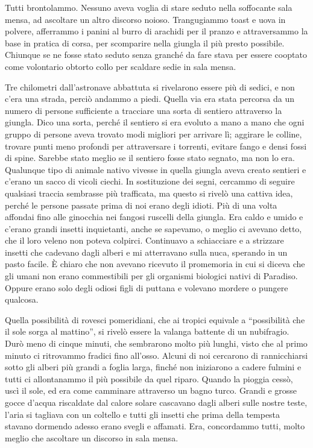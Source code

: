 Tutti brontolammo. Nessuno aveva voglia di stare seduto nella soffocante
sala mensa, ad ascoltare un altro discorso noioso. Trangugiammo toast e
uova in polvere, afferrammo i panini al burro di arachidi per il pranzo
e attraversammo la base in pratica di corsa, per scomparire nella
giungla il più presto possibile. Chiunque se ne fosse stato seduto senza
granché da fare stava per essere cooptato come volontario obtorto collo
per scaldare sedie in sala mensa.

Tre chilometri dall'astronave abbattuta si rivelarono essere più di
sedici, e non c'era una strada, perciò andammo a piedi. Quella via era
stata percorsa da un numero di persone sufficiente a tracciare una sorta
di sentiero attraverso la giungla. Dico una sorta, perché il sentiero si
era evoluto a mano a mano che ogni gruppo di persone aveva trovato modi
migliori per arrivare lì; aggirare le colline, trovare punti meno
profondi per attraversare i torrenti, evitare fango e densi fossi di
spine. Sarebbe stato meglio se il sentiero fosse stato segnato, ma non
lo era. Qualunque tipo di animale nativo vivesse in quella giungla aveva
creato sentieri e c'erano un sacco di vicoli ciechi. In sostituzione dei
segni, cercammo di seguire qualsiasi traccia sembrasse più trafficata,
ma questo si rivelò una cattiva idea, perché le persone passate prima di
noi erano degli idioti. Più di una volta affondai fino alle ginocchia
nei fangosi ruscelli della giungla. Era caldo e umido e c'erano grandi
insetti inquietanti, anche se sapevamo, o meglio ci avevano detto, che
il loro veleno non poteva colpirci. Continuavo a schiacciare e a
strizzare insetti che cadevano dagli alberi e mi atterravano sulla nuca,
sperando in un pasto facile. È chiaro che non avevano ricevuto il
promemoria in cui si diceva che gli umani non erano commestibili per gli
organismi biologici nativi di Paradiso. Oppure erano solo degli odiosi
figli di puttana e volevano mordere o pungere qualcosa.

Quella possibilità di rovesci pomeridiani, che ai tropici equivale a
``possibilità che il sole sorga al mattino'', si rivelò essere la
valanga battente di un nubifragio. Durò meno di cinque minuti, che
sembrarono molto più lunghi, visto che al primo minuto ci ritrovammo
fradici fino all'osso. Alcuni di noi cercarono di rannicchiarsi sotto
gli alberi più grandi a foglia larga, finché non iniziarono a cadere
fulmini e tutti ci allontanammo il più possibile da quel riparo. Quando
la pioggia cessò, uscì il sole, ed era come camminare attraverso un
bagno turco. Grandi e grosse gocce d'acqua riscaldate dal calore solare
cascavano dagli alberi sulle nostre teste, l'aria si tagliava con un
coltello e tutti gli insetti che prima della tempesta stavano dormendo
adesso erano svegli e affamati. Era, concordammo tutti, molto meglio che
ascoltare un discorso in sala mensa.

